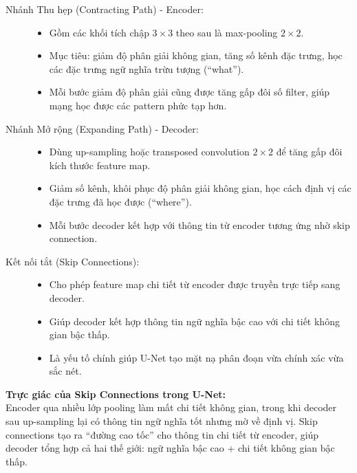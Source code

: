 \begin{description}
	\item[Nhánh Thu hẹp (Contracting Path) - Encoder:] 
	\begin{itemize}
		\item Gồm các khối tích chập $3 \times 3$ theo sau là max-pooling $2 \times 2$.
		\item Mục tiêu: giảm độ phân giải không gian, tăng số kênh đặc trưng, học các đặc trưng ngữ nghĩa trừu tượng (“what”).
		\item Mỗi bước giảm độ phân giải cũng được tăng gấp đôi số filter, giúp mạng học được các pattern phức tạp hơn.
	\end{itemize}
	
	\item[Nhánh Mở rộng (Expanding Path) - Decoder:] 
	\begin{itemize}
		\item Dùng up-sampling hoặc transposed convolution $2 \times 2$ để tăng gấp đôi kích thước feature map.
		\item Giảm số kênh, khôi phục độ phân giải không gian, học cách định vị các đặc trưng đã học được (“where”).
		\item Mỗi bước decoder kết hợp với thông tin từ encoder tương ứng nhờ skip connection.
	\end{itemize}
	
	\item[Kết nối tắt (Skip Connections):] 
	\begin{itemize}
		\item Cho phép feature map chi tiết từ encoder được truyền trực tiếp sang decoder.
		\item Giúp decoder kết hợp thông tin ngữ nghĩa bậc cao với chi tiết không gian bậc thấp.
		\item Là yếu tố chính giúp U-Net tạo mặt nạ phân đoạn vừa chính xác vừa sắc nét.
	\end{itemize}
\end{description}

\begin{mdframed}[style=infobox]
	\textbf{Trực giác của Skip Connections trong U-Net:} \\
	Encoder qua nhiều lớp pooling làm mất chi tiết không gian, trong khi decoder sau up-sampling lại có thông tin ngữ nghĩa tốt nhưng mờ về định vị. Skip connections tạo ra “đường cao tốc” cho thông tin chi tiết từ encoder, giúp decoder tổng hợp cả hai thế giới: ngữ nghĩa bậc cao + chi tiết không gian bậc thấp.
\end{mdframed}


